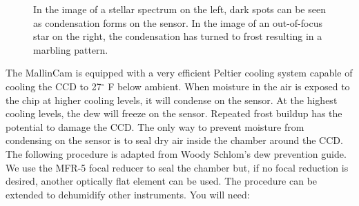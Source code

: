 \documentclass[12pt,titlepage]{article}
\renewcommand\deg{\mbox{$^\circ$}}
\begin{document}
\begin{figure}[H]
	\caption{In the image of a stellar spectrum on the left, dark spots can be seen as condensation forms on the sensor.
				In the image of an out-of-focus star on the right, the condensation has turned to frost resulting in a 
				marbling pattern.}
\end{figure}


The MallinCam is equipped with a very efficient Peltier cooling system capable of cooling the CCD to 27$\deg$ F below ambient.
When moisture in the air is exposed to the chip at higher cooling levels, it will condense on the sensor.
At the highest cooling levels, the dew will freeze on the sensor.
Repeated frost buildup has the potential to damage the CCD.
The only way to prevent moisture from condensing on the sensor is to seal dry air inside the chamber around the CCD.
The following procedure is adapted from Woody Schlom's dew prevention guide.
We use the MFR-5 focal reducer to seal the chamber but, if no focal reduction is desired, another optically flat element can be used.
The procedure can be extended to dehumidify other instruments.
You will need:
\end{document}
